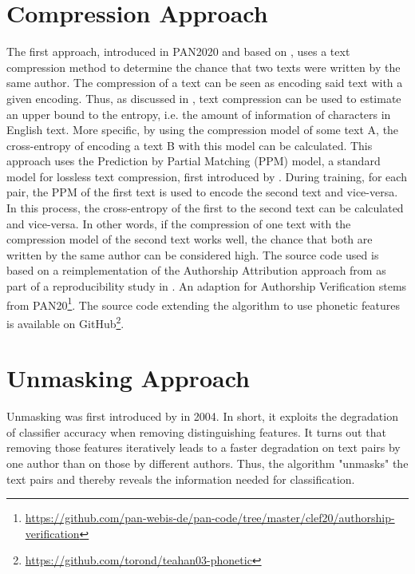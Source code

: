 \section{Compression Approach}
The first approach, introduced in PAN2020 and based on \cite{teahan2003compression}, uses a text compression method to determine the chance that two texts were written by the same author.
The compression of a text can be seen as encoding said text with a given encoding.
Thus, as discussed in \cite{brown1992upperBoundEntropy}, text compression can be used to estimate an upper bound to the entropy, i.e. the amount of information of characters in English text.
More specific, by using the compression model of some text A, the cross-entropy of encoding a text B with this model can be calculated.
This approach uses the Prediction by Partial Matching (PPM) model, a standard model for lossless text compression, first introduced by \cite{cleary1984PPM}.
During training, for each pair, the PPM of the first text is used to encode the second text and vice-versa.
In this process, the cross-entropy of the first to the second text can be calculated and vice-versa.
In other words, if the compression of one text with the compression model of the second text works well, the chance that both are written by the same author can be considered high.
The source code used is based on a reimplementation of the Authorship Attribution approach from \cite{teahan2003compression} as part of a reproducibility study in \cite{potthast2016reimplementation}.
An adaption for Authorship Verification stems from PAN20\footnote{\url{https://github.com/pan-webis-de/pan-code/tree/master/clef20/authorship-verification}}.
The source code extending the algorithm to use phonetic features is available on GitHub\footnote{\url{https://github.com/torond/teahan03-phonetic}}.

\section{Unmasking Approach}
Unmasking was first introduced by \cite{koppel2004unmasking} in 2004.
In short, it exploits the degradation of classifier accuracy when removing distinguishing features.
It turns out that removing those features iteratively leads to a faster degradation on text pairs by one author than on those by different authors.
Thus, the algorithm "unmasks" the text pairs and thereby reveals the information needed for classification.\\

